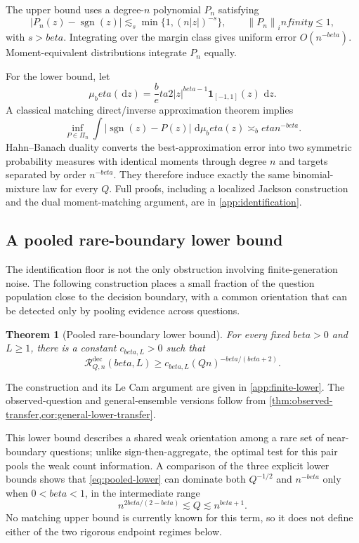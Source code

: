 \documentclass[11pt]{article}
\def\beta{beta}%
\def\infty{infinity}%
\newtheorem{theorem}{Theorem}[section]
\newcommand{\one}{\mathbf 1}
\newcommand{\sgn}{\operatorname{sgn}}
\newcommand{\calR}{\mathcal R}
\newcommand{\norm}[1]{\left\lVert#1\right\rVert}
\newcommand{\dd}{\,\mathrm d}
\begin{document}
The upper bound uses a degree-$n$ polynomial $P_n$ satisfying
\[
|P_n(z)-\sgn(z)|
\lesssim_s
\min\{1,(n|z|)^{-s}\},
\qquad \norm{P_n}_\infty\le1,
\]
with $s>\beta$.  Integrating over the margin class gives uniform error $O(n^{-\beta})$.  Moment-equivalent distributions integrate $P_n$ equally.

For the lower bound, let
\[
\mu_\beta(\dd z)
=
\frac\beta2|z|^{\beta-1}\one_{[-1,1]}(z)\,\dd z.
\]
A classical matching direct/inverse approximation theorem implies
\begin{equation}
\label{eq:weighted-L1}
\inf_{P\in\Pi_n}
\int|\sgn(z)-P(z)|\,\dd\mu_\beta(z)
\asymp_\beta n^{-\beta}.
\end{equation}
Hahn--Banach duality converts the best-approximation error into two symmetric probability measures with identical moments through degree $n$ and targets separated by order $n^{-\beta}$.  They therefore induce exactly the same binomial-mixture law for every $Q$.  Full proofs, including a localized Jackson construction and the dual moment-matching argument, are in \cref{app:identification}.

\subsection{A pooled rare-boundary lower bound}

The identification floor is not the only obstruction involving finite-generation noise.  The following construction places a small fraction of the question population close to the decision boundary, with a common orientation that can be detected only by pooling evidence across questions.

\begin{theorem}[Pooled rare-boundary lower bound]
\label{thm:pooled-lower}
For every fixed $\beta>0$ and $L\ge1$, there is a constant $c_{\beta,L}>0$ such that
\begin{equation}
\label{eq:pooled-lower}
\calR^{\mathrm{dec}}_{Q,n}(\beta,L)
\ge
c_{\beta,L}(Qn)^{-\beta/(\beta+2)}.
\end{equation}
\end{theorem}
The construction and its Le Cam argument are given in \cref{app:finite-lower}.  The observed-question and general-ensemble versions follow from \cref{thm:observed-transfer,cor:general-lower-transfer}.

This lower bound describes a shared weak orientation among a rare set of near-boundary questions; unlike sign-then-aggregate, the optimal test for this pair pools the weak count information.  A comparison of the three explicit lower bounds shows that \eqref{eq:pooled-lower} can dominate both $Q^{-1/2}$ and $n^{-\beta}$ only when $0<\beta<1$, in the intermediate range
\[
n^{2\beta/(2-\beta)}
\lesssim Q
\lesssim n^{\beta+1}.
\]
No matching upper bound is currently known for this term, so it does not define either of the two rigorous endpoint regimes below.
\end{document}
